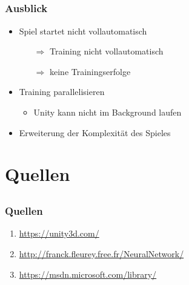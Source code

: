 \documentclass[compress]{beamer}
\begin{document}
\subsection*{}

\begin{frame}
	\frametitle{Ausblick}

	\begin{itemize}
		\item Spiel startet nicht vollautomatisch
		\begin{itemize}
			\item[$\Rightarrow$] Training nicht vollautomatisch
			\item[$\Rightarrow$] keine Trainingserfolge
		\end{itemize}
		\item Training parallelisieren
		\begin{itemize}
			\item Unity kann nicht im Background laufen
		\end{itemize}
		\item Erweiterung der Komplexität des Spieles
	\end{itemize}
\end{frame}

\section{Quellen}
\subsection*{}

\begin{frame}
	\frametitle{Quellen}

	
	
	\begin{enumerate}
		\item \url{https://unity3d.com/}
		\item \url{http://franck.fleurey.free.fr/NeuralNetwork/}
		\item \url{https://msdn.microsoft.com/library/}
	\end{enumerate}
\end{frame}
\end{document}
